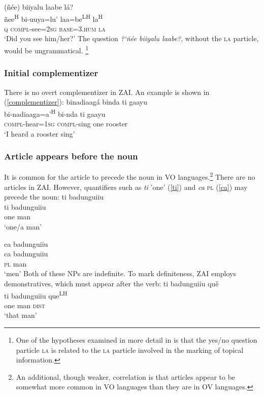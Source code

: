\ea
{}(\~{n}\'{e}e) biiyalu laabe l\'{a}? \\
\~{n}ee\textsuperscript{H} bi-uuya=lu' laa=be\textsuperscript{LH} la\textsuperscript{H} \\
\textsc{q} \textsc{compl}-see=\textsc{2sg} \textsc{base}=\textsc{3.hum} \textsc{la} \\
\glt `Did you see him/her?'
\z
The question \textit{{?`}\~{n}\'{e}e biiyalu laabe?}, without the \textsc{la} particle, would be ungrammatical. \footnote{One of the hypotheses examined in more detail in  is that the yes/no question particle \textsc{la} is related to the \textsc{la} particle involved in the marking of topical information.}


\subsubsection{Initial complementizer}

There is no overt complementizer in ZAI. An example is shown in (\ref{complementizer}):
\ea\label{complementizer}
\glll binadiaag\'{a} binda ti gaayu \\
bi-nadiaaga=a'\textsuperscript{H} bi-nda ti gaayu \\
\textsc{compl}-hear=\textsc{1sg} \textsc{compl}-sing one rooster \\
\glt `I heard a rooster sing'
\z


\subsubsection{Article appears before the noun}

It is common for the article to precede the noun in VO languages.\footnote{An additional, though weaker, correlation is that articles appear to be somewhat more common in VO languages than they are in OV languages.} There are no articles in ZAI. However, quantifiers such as \textit{ti} 'one' (\ref{ti}) and \textit{ca} \textsc{pl} (\ref{ca}) may precede the noun:
\ea\label{ti}
\glll ti badunguiiu \\
ti badunguiiu \\
one man \\
\glt `one/a man'

\z

\ea\label{ca}
\glll ca badunguiiu \\
ca badunguiiu \\
\textsc{pl} man \\
\glt `men'
\z
Both of these NPs are indefinite. To mark definiteness, ZAI employs demonstratives, which must appear after the verb:
\ea\label{ti2}
\glll ti badunguiiu qu\v{e} \\
ti badunguiiu que\textsuperscript{LH} \\
one man \textsc{dist} \\
\glt `that man'
\z

